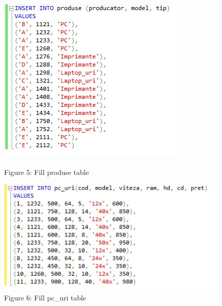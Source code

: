 \begin{figure}[H]
	\centering
		\includegraphics[width=\linewidth]{screens/5.jpg}
		\caption*{Figure 5: Fill produse table}
		\label{}
	\endminipage\hfill
		\includegraphics[width=\linewidth]{screens/6.jpg}
		\caption*{Figure 6: Fill pc\_uri table}
	\endminipage
\end{figure}

